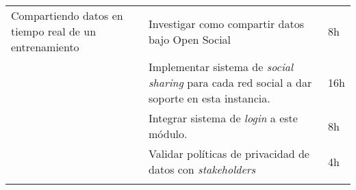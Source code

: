 \begin{longtable}[c]{@{}lll@{}}
\\\noalign{\medskip}
\begin{minipage}[t]{0.28\columnwidth}\raggedright
Compartiendo datos en tiempo real de un entrenamiento
\end{minipage} & \begin{minipage}[t]{0.62\columnwidth}\raggedright
Investigar como compartir datos bajo Open Social
\end{minipage} & \begin{minipage}[t]{0.10\columnwidth}\raggedright
8h
\end{minipage}
\\\noalign{\medskip}
\begin{minipage}[t]{0.28\columnwidth}\raggedright
\end{minipage} & \begin{minipage}[t]{0.62\columnwidth}\raggedright
Implementar sistema de \emph{social sharing} para cada red social a dar
soporte en esta instancia.
\end{minipage} & \begin{minipage}[t]{0.10\columnwidth}\raggedright
16h
\end{minipage}
\\\noalign{\medskip}
\begin{minipage}[t]{0.28\columnwidth}\raggedright
\end{minipage} & \begin{minipage}[t]{0.62\columnwidth}\raggedright
Integrar sistema de \emph{login} a este módulo.
\end{minipage} & \begin{minipage}[t]{0.10\columnwidth}\raggedright
8h
\end{minipage}
\\\noalign{\medskip}
\begin{minipage}[t]{0.28\columnwidth}\raggedright
\end{minipage} & \begin{minipage}[t]{0.62\columnwidth}\raggedright
Validar políticas de privacidad de datos con \emph{stakeholders}
\end{minipage} & \begin{minipage}[t]{0.10\columnwidth}\raggedright
4h
\end{minipage}
\\\noalign{\medskip}
\begin{minipage}[t]{0.28\columnwidth}\raggedright
\end{minipage} & \begin{minipage}[t]{0.62\columnwidth}\raggedright

\end{minipage}
\end{longtable}
